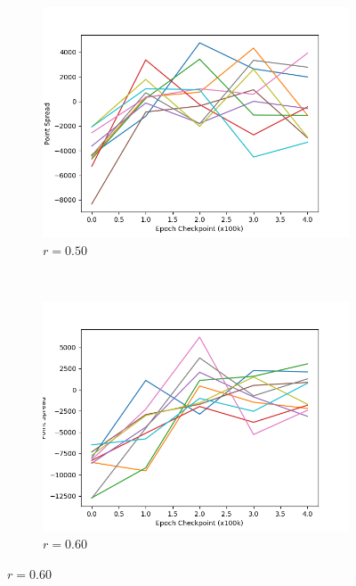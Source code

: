 
\begin{figure}

	\begin{subfigure}[t]{0.48\textwidth}
		\center
		\includegraphics[width=\textwidth]{images/findings/experiments/regularization/tourny/reg_050-kyttuhat-strict-500k.png}
		\caption{$r = 0.50$}
		\label{fig:reg-tournies-0.50}
	\end{subfigure}
	~
	\begin{subfigure}[t]{0.48\textwidth}
		\center
		\includegraphics[width=\textwidth]{images/findings/experiments/regularization/tourny/reg_060-kyttuhat-strict-500k.png}
		\caption{$r = 0.60$}
		\label{fig:reg-tournies-0.60}
	\end{subfigure}


\end{figure}
